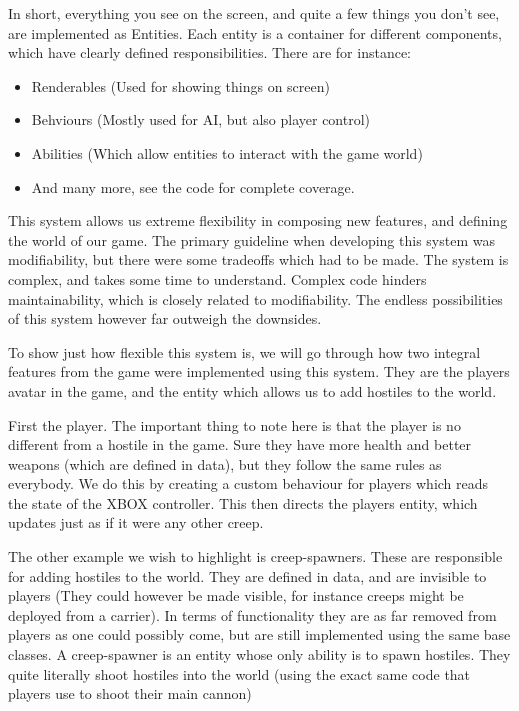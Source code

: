 In short, everything you see on the screen, and quite a few things you don't
see, are implemented as Entities. Each entity is a container for different
components, which have clearly defined responsibilities. There are for 
instance:
\begin{itemize}
    \item Renderables (Used for showing things on screen)
    \item Behviours (Mostly used for AI, but also player control)
    \item Abilities (Which allow entities to interact with the game world)
    \item And many more, see the code for complete coverage.
\end{itemize}

This system allows us extreme flexibility in composing new features, and 
defining the world of our game. The primary guideline when developing this
system was modifiability, but there were some tradeoffs which had to be made.
The system is complex, and takes some time to understand. Complex code hinders
maintainability, which is closely related to modifiability. The endless 
possibilities of this system however far outweigh the downsides.

To show just how flexible this system is, we will go through how two integral
features from the game were implemented using this system. They are the players
avatar in the game, and the entity which allows us to add hostiles to the 
world.

First the player. The important thing to note here is that the player is no
different from a hostile in the game. Sure they have more health and better
weapons (which are defined in data), but they follow the same rules as 
everybody. We do this by creating a custom behaviour for players which reads 
the state of the XBOX controller. This then directs the players entity, which
updates just as if it were any other creep.

The other example we wish to highlight is creep-spawners. These are responsible
for adding hostiles to the world. They are defined in data, and are invisible
to players (They could however be made visible, for instance creeps might be
deployed from a carrier). In terms of functionality they are as far removed 
from players as one could possibly come, but are still implemented using the
same base classes.  A creep-spawner is an entity whose only ability is to spawn
hostiles. They quite literally shoot hostiles into the world (using the exact
same code that players use to shoot their main cannon)

